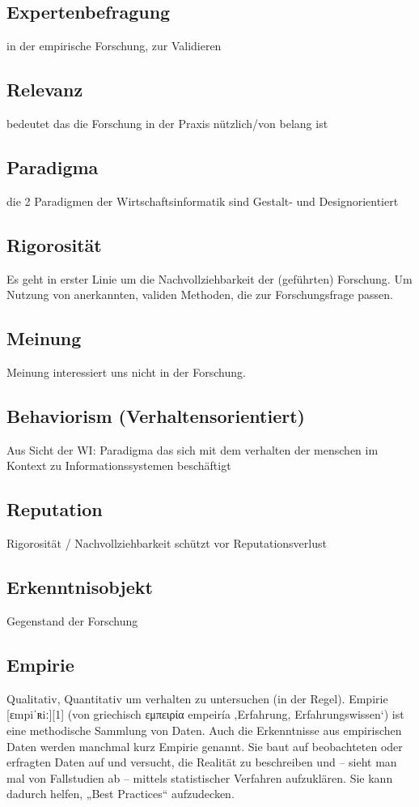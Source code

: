 \documentclass[DIV=calc, paper=a4, fontsize=11pt, twocolumn]{scrartcl}	 %
\begin{document}
\subsection*{Expertenbefragung}
in der empirische Forschung, zur Validieren

\subsection*{Relevanz}
bedeutet das die Forschung in der Praxis n\"utzlich/von belang ist

\subsection*{Paradigma}
die 2 Paradigmen der Wirtschaftsinformatik sind Gestalt- und Designorientiert

\subsection*{Rigorosit\"at}
Es geht in erster Linie um die Nachvollziehbarkeit der (gef\"uhrten) Forschung. Um Nutzung von anerkannten, validen Methoden, die zur Forschungsfrage passen.
\subsection*{Meinung}
Meinung interessiert uns nicht in der Forschung.

\subsection*{Behaviorism (Verhaltensorientiert)}
Aus Sicht der WI: Paradigma das sich mit dem verhalten der menschen im Kontext zu Informationssystemen besch\"aftigt

\subsection*{Reputation}
Rigorosit\"at / Nachvollziehbarkeit sch\"utzt vor Reputationsverlust

\subsection*{Erkenntnisobjekt}
Gegenstand der Forschung

\subsection*{Empirie}
Qualitativ, Quantitativ um verhalten zu untersuchen (in der Regel).
Empirie [ɛmpiˈʀiː][1] (von griechisch εμπειρία empeiría ‚Erfahrung, Erfahrungswissen‘) ist eine methodische Sammlung von Daten. Auch die Erkenntnisse aus empirischen Daten werden manchmal kurz Empirie genannt.\cite{Wikipedia:2016a}
Sie baut auf beobachteten oder erfragten Daten auf und versucht, die Realität zu beschreiben und – sieht man mal von Fallstudien ab – mittels statistischer Verfahren aufzuklären. Sie kann dadurch helfen, „Best Practices“ aufzudecken. \cite{Hess et al:2014}
\end{document}
